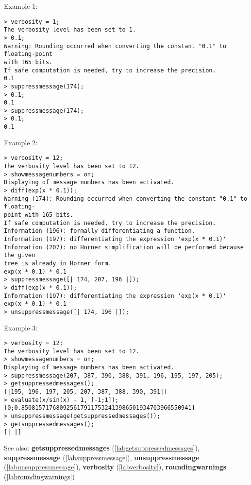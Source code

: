 \noindent Example 1: 
\begin{center}\begin{minipage}{15cm}\begin{Verbatim}[frame=single,commandchars=\\\|\~]
> verbosity = 1;
The verbosity level has been set to 1.
> 0.1;
Warning: Rounding occurred when converting the constant "0.1" to floating-point 
with 165 bits.
If safe computation is needed, try to increase the precision.
0.1
> suppressmessage(174);
> 0.1;
0.1
> suppressmessage(174);
> 0.1;
0.1
\end{Verbatim}
\end{minipage}\end{center}
\noindent Example 2: 
\begin{center}\begin{minipage}{15cm}\begin{Verbatim}[frame=single,commandchars=\\\|\~]
> verbosity = 12;
The verbosity level has been set to 12.
> showmessagenumbers = on; 
Displaying of message numbers has been activated.
> diff(exp(x * 0.1));
Warning (174): Rounding occurred when converting the constant "0.1" to floating-
point with 165 bits.
If safe computation is needed, try to increase the precision.
Information (196): formally differentiating a function.
Information (197): differentiating the expression 'exp(x * 0.1)'
Information (207): no Horner simplification will be performed because the given 
tree is already in Horner form.
exp(x * 0.1) * 0.1
> suppressmessage([| 174, 207, 196 |]);
> diff(exp(x * 0.1));
Information (197): differentiating the expression 'exp(x * 0.1)'
exp(x * 0.1) * 0.1
> unsuppressmessage([| 174, 196 |]);
\end{Verbatim}
\end{minipage}\end{center}
\noindent Example 3: 
\begin{center}\begin{minipage}{15cm}\begin{Verbatim}[frame=single,commandchars=\\\|\~]
> verbosity = 12;
The verbosity level has been set to 12.
> showmessagenumbers = on;
Displaying of message numbers has been activated.
> suppressmessage(207, 387, 390, 388, 391, 196, 195, 197, 205);
> getsuppressedmessages();
[|195, 196, 197, 205, 207, 387, 388, 390, 391|]
> evaluate(x/sin(x) - 1, [-1;1]);
[0;0.8508157176809256179117532413986501934703966550941]
> unsuppressmessage(getsuppressedmessages());
> getsuppressedmessages();
[| |]
\end{Verbatim}
\end{minipage}\end{center}
See also: \textbf{getsuppressedmessages} (\ref{labgetsuppressedmessages}), \textbf{suppressmessage} (\ref{labsuppressmessage}), \textbf{unsuppressmessage} (\ref{labunsuppressmessage}), \textbf{verbosity} (\ref{labverbosity}), \textbf{roundingwarnings} (\ref{labroundingwarnings})
